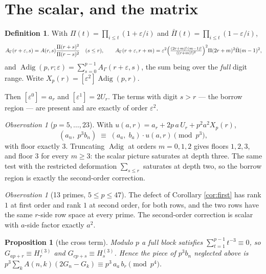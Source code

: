 \documentclass[11pt,a4paper]{amsart}
\theoremstyle{plain}
\newtheorem{proposition}[theorem]{Proposition}
\theoremstyle{definition}
\newtheorem{definition}[theorem]{Definition}
\theoremstyle{remark}
\newtheorem{observation}[theorem]{Observation}
\newcommand{\A}{A}
\begin{document}
\section{The scalar, and the matrix}

\begin{definition}\label{def:adig}
With $\Pi(t)=\prod_{i\le t}(1+\varepsilon/i)$ and $\bar\Pi(t)=\prod_{i\le t}(1-\varepsilon/i)$,
\[
  \A_\Gamma(r+\varepsilon,s)=\A(r,s)\frac{\Pi(r+s)^2}{\Pi(r-s)^2}\quad(s\le r),
  \qquad
  \A_\Gamma(r+\varepsilon,r+m)=\varepsilon^2\Bigl(\tfrac{(2r+m)!\,(m-1)!}{((r+m)!)^2}\Bigr)^{2}
  \Pi(2r+m)^2\bar\Pi(m-1)^2 ,
\]
and $\operatorname{Adig}(p,r;\varepsilon)=\sum_{s=0}^{p-1}\A_\Gamma(r+\varepsilon,s)$, the sum
being over the \emph{full} digit range. Write $X_p(r)=[\varepsilon^2]\operatorname{Adig}(p,r)$.
\end{definition}

Then $[\varepsilon^0]=a_r$ and $[\varepsilon^1]=2U_r$. The terms with digit $s>r$ — the
borrow region — are present and are exactly of order $\varepsilon^2$.

\begin{observation}[$p=5,\dots,23$]\label{obs:scalar}
With $u(a,r)=a_r+2p\,a\,U_r+p^2a^2X_p(r)$,
\[
  (a_n,\;p^3b_n)\;\equiv\;(a_a,\;b_a)\cdot u(a,r) \pmod{p^3},
\]
with floor exactly $3$. Truncating $\operatorname{Adig}$ at orders $m=0,1,2$ gives floors
$1,2,3$, and floor $3$ for every $m\ge3$: the scalar picture saturates at depth three.
The same test with the restricted deformation $\sum_{s\le r}$ saturates at depth two, so
the borrow region is exactly the second-order correction.
\end{observation}

\begin{observation}[13 primes, $5\le p\le47$]\label{obs:rank}
The defect of Corollary \ref{cor:first} has rank $1$ at first order and rank $1$ at
second order, for both rows, and the two rows have the same $r$-side row space at every
prime. The second-order correction is scalar with $a$-side factor exactly $a^2$.
\end{observation}

\begin{proposition}[the cross term]\label{prop:cross}
Modulo $p$ a full block satisfies $\sum_{t=1}^{p-1}t^{-3}\equiv0$, so $G_{ap+r}\equiv H^{(3)}_r$
and $G_{cp+s}\equiv H^{(3)}_s$. Hence the piece of $p^3b_n$ neglected above is
$p^3\sum_k \A(n,k)(2G_n-G_k)\equiv p^3\,a_a\,b_r \pmod {p^4}$.
\end{proposition}
\end{document}
